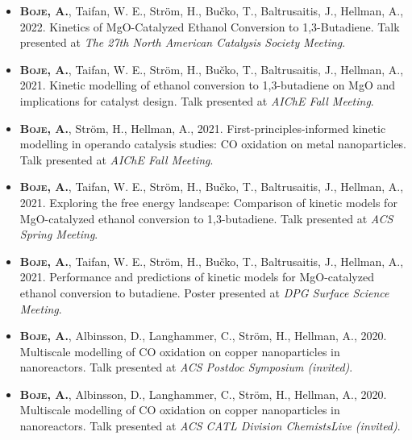 \documentclass[11pt,a4paper,sans]{moderncv}   %
\def\addls{\vspace{2pt}}
\begin{document}
	\begin{itemize}
		\item{\textbf{\textsc{Boje}, A.}, Taifan, W. E., Str\"om, H., Bu\v{c}ko, T., Baltrusaitis, J., Hellman, A., 2022. Kinetics of MgO-Catalyzed Ethanol Conversion to 1,3-Butadiene. Talk presented at \textit{The 27th North American Catalysis Society Meeting}.}
		
		\item{\textbf{\textsc{Boje}, A.}, Taifan, W. E., Str\"om, H., Bu\v{c}ko, T., Baltrusaitis, J., Hellman, A., 2021. Kinetic modelling of ethanol conversion to 1,3-butadiene on MgO and implications for catalyst design. Talk presented at \textit{AIChE Fall Meeting}.}
		
		\addls
		
		\item{\textbf{\textsc{Boje}, A.}, Str\"om, H., Hellman, A., 2021. First-principles-informed kinetic modelling in operando catalysis studies: CO oxidation on metal nanoparticles. Talk presented at \textit{AIChE Fall Meeting}.}
		
		\addls
		
		\item{\textbf{\textsc{Boje}, A.}, Taifan, W. E., Str\"om, H., Bu\v{c}ko, T., Baltrusaitis, J., Hellman, A., 2021. Exploring the free energy landscape: Comparison of kinetic models for MgO-catalyzed ethanol conversion to 1,3-butadiene. Talk presented at \textit{ACS Spring Meeting}.}
		
		\addls
		
		\item{\textbf{\textsc{Boje}, A.}, Taifan, W. E., Str\"om, H., Bu\v{c}ko, T., Baltrusaitis, J., Hellman, A., 2021. Performance and predictions of kinetic models for MgO-catalyzed ethanol conversion to butadiene. Poster presented at \textit{DPG Surface Science Meeting}.}
		
		\addls
		
		\item{\textbf{\textsc{Boje}, A.}, Albinsson, D., Langhammer, C., Str\"om, H., Hellman, A., 2020. Multiscale modelling of CO oxidation on copper nanoparticles in nanoreactors. Talk presented at \textit{ACS Postdoc Symposium (invited)}.}
		
		\addls
		
		\item{\textbf{\textsc{Boje}, A.}, Albinsson, D., Langhammer, C., Str\"om, H., Hellman, A., 2020. Multiscale modelling of CO oxidation on copper nanoparticles in nanoreactors. Talk presented at \textit{ACS CATL Division ChemistsLive (invited)}.}
		

\end{itemize}
\end{document}
